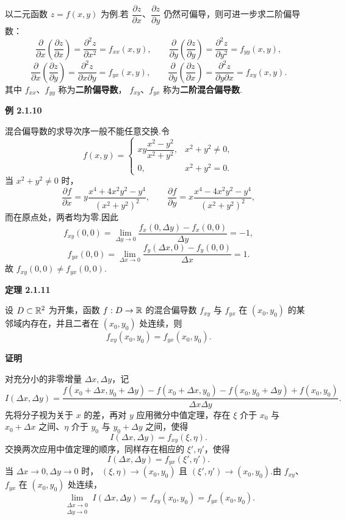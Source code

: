 以二元函数 $z=f(x,y)$ 为例.若
$\dfrac{\partial z}{\partial x}$、$\dfrac{\partial z}{\partial y}$
仍然可偏导，则可进一步求二阶偏导数：
\[
\frac{\partial}{\partial x}
\left(\frac{\partial z}{\partial x}\right)
=
\frac{\partial^2z}{\partial x^2}
=f_{xx}(x,y),
\qquad
\frac{\partial}{\partial y}
\left(\frac{\partial z}{\partial y}\right)
=
\frac{\partial^2z}{\partial y^2}
=f_{yy}(x,y),
\]
\[
\frac{\partial}{\partial x}
\left(\frac{\partial z}{\partial y}\right)
=
\frac{\partial^2z}{\partial x\partial y}
=f_{yx}(x,y),
\qquad
\frac{\partial}{\partial y}
\left(\frac{\partial z}{\partial x}\right)
=
\frac{\partial^2z}{\partial y\partial x}
=f_{xy}(x,y).
\]
其中 $f_{xx}$、$f_{yy}$ 称为\textbf{二阶偏导数}，
$f_{xy}$、$f_{yx}$ 称为\textbf{二阶混合偏导数}.



\textbf{例 2.1.10}

混合偏导数的求导次序一般不能任意交换.令
	\[
	f(x,y)=
	\begin{cases}
	xy\dfrac{x^2-y^2}{x^2+y^2},&x^2+y^2\ne0,\\[6pt]
	0,&x^2+y^2=0.
	\end{cases}
	\]
	当 $x^2+y^2\ne0$ 时，
	\[
	\frac{\partial f}{\partial x}
	=
	y\frac{x^4+4x^2y^2-y^4}{(x^2+y^2)^2},
	\qquad
	\frac{\partial f}{\partial y}
	=
	x\frac{x^4-4x^2y^2-y^4}{(x^2+y^2)^2},
	\]
	而在原点处，两者均为零.因此
	\[
	f_{xy}(0,0)
	=
	\lim_{\Delta y\to0}
	\frac{f_x(0,\Delta y)-f_x(0,0)}{\Delta y}
	=-1,
	\]
	\[
	f_{yx}(0,0)
	=
	\lim_{\Delta x\to0}
	\frac{f_y(\Delta x,0)-f_y(0,0)}{\Delta x}
	=1.
	\]
	故 $f_{xy}(0,0)\ne f_{yx}(0,0)$.






\textbf{定理 2.1.11}

设 $D\subset\mathbb{R}^2$ 为开集，函数 $f:D\to\mathbb{R}$ 的混合偏导数
	$f_{xy}$ 与 $f_{yx}$ 在 $(x_0,y_0)$ 的某邻域内存在，并且二者在
	$(x_0,y_0)$ 处连续，则
	\[
	f_{xy}(x_0,y_0)=f_{yx}(x_0,y_0).
	\]






\textbf{证明}

对充分小的非零增量 $\Delta x,\Delta y$，记
	\[
	I(\Delta x,\Delta y)
	=
	\frac{
	f(x_0+\Delta x,y_0+\Delta y)-f(x_0+\Delta x,y_0)
	-f(x_0,y_0+\Delta y)+f(x_0,y_0)}
	{\Delta x\Delta y}.
	\]
	先将分子视为关于 $x$ 的差，再对 $y$ 应用微分中值定理，存在
	$\xi$ 介于 $x_0$ 与 $x_0+\Delta x$ 之间、$\eta$ 介于
	$y_0$ 与 $y_0+\Delta y$ 之间，使得
	\[
	I(\Delta x,\Delta y)=f_{xy}(\xi,\eta).
	\]
	交换两次应用中值定理的顺序，同样存在相应的
	$\xi',\eta'$，使得
	\[
	I(\Delta x,\Delta y)=f_{yx}(\xi',\eta').
	\]
	当 $\Delta x\to0,\Delta y\to0$ 时，
	$(\xi,\eta)\to(x_0,y_0)$ 且
	$(\xi',\eta')\to(x_0,y_0)$.由 $f_{xy}$、$f_{yx}$
	在 $(x_0,y_0)$ 处连续，
	\[
	\lim_{\substack{\Delta x\to0\\\Delta y\to0}}
	I(\Delta x,\Delta y)
	=f_{xy}(x_0,y_0)
	=f_{yx}(x_0,y_0).
	\]


